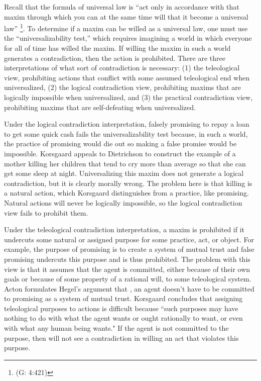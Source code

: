 \begin{isabellebody}
\begin{isamarkuptext}
Recall that the formula of universal law is “act only in accordance with that maxim through which you can at the 
same time will that it become a universal law” \cite{groundwork}\footnote{(G: 4:421)}. To determine if a maxim can be willed as a 
universal law, one must use the “universalizability test,” which requires imagining a world in which 
everyone for all of time has willed the maxim. If willing the maxim in such a world generates a contradiction, 
then the action is prohibited. There are three interpretations of what sort of contradiction is necessary: 
(1) the teleological view, prohibiting actions that conflict with some assumed teleological end when 
universalized, (2) the logical contradiction view, prohibiting maxims that are logically impossible 
when universalized, and (3) the practical contradiction view, prohibiting maxims that are self-defeating 
when universalized.

Under the logical contradiction interpretation, falsely promising to repay a loan to get some quick cash
fails the universalizability test because, in such a world, the practice of promising would die out so 
making a false promise would be impossible. Korsgaard appeals to Dietrichson \cite{dietrichson} to construct the example of 
a mother killing her children that tend to cry more than average so that she can get some 
sleep at night. Universalizing this maxim does not generate a logical contradiction, but it is clearly 
morally wrong. The problem here is that killing is a natural action, which Korsgaard distinguishes from 
a practice, like promising. Natural actions will never be logically impossible, so the logical contradiction 
view fails to prohibit them.

Under the teleological contradiction interpretation, a maxim is prohibited if it undercuts some natural 
or assigned purpose for some practice, act, or object. For example, the purpose of promising is to 
create a system of mutual trust and false promising undercuts this purpose and is thus prohibited. The problem 
with this view is that it assumes that the agent is committed, either because of their own goals or 
because of some property of a rational will, to some teleological system. Acton formulates Hegel's argument that \cite{acton},
an agent doesn't have to be committed to promising as a system of mutual trust. Korsgaard concludes that 
assigning teleological purposes to actions is difficult because ``such purposes may have
nothing to do with what the agent wants or ought rationally to want, or even with what
any human being wants." If the agent is not committed to the purpose, then will not see a contradiction 
in willing an act that violates this purpose.


\end{isamarkuptext}
\end{isabellebody}
